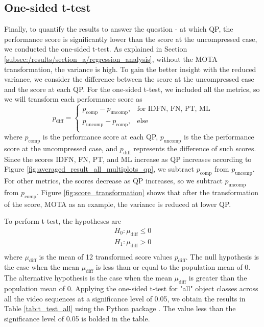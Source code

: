 \subsection{One-sided t-test}
\label{subsec:/results/section_a/t_test}
Finally, to quantify the results to answer the question - at which QP, the performance score is significantly lower than the score at the uncompressed case, we conducted the one-sided t-test. As explained in Section \ref{subsec:/results/section_a/regression_analysis}, without the MOTA transformation, the variance is high. To gain the better insight with the reduced variance, we consider the difference between the score at the uncompressed case and the score at each QP. For the one-sided t-test, we included all the metrics, so we will transform each performance score as
\begin{equation}
  p_{\text{diff}} =
    \begin{cases}
         p_{\text{comp}} - p_{\text{uncomp}} ,& \text{for IDFN, FN, PT, ML} \\        
         p_{\text{uncomp}} - p_{\text{comp}} ,& \text{else} \\
    \end{cases}
\end{equation}
where $p_{\text{comp}}$ is the performance score at each QP, $p_{\text{uncomp}}$ is the the performance score at the uncompressed case, and $p_{\text{diff}}$ represents the difference of such scores. Since the scores IDFN, FN, PT, and ML increase as QP increases according to Figure \ref{fig:averaged_result_all_multiplots_qp}, we subtract $p_{\text{comp}}$ from $p_{\text{uncomp}}$. For other metrics, the scores decrease as QP increases, so we subtract $p_{\text{uncomp}}$ from $p_{\text{comp}}$. Figure \ref{fig:score_transformation} shows that after the transformation of the score, MOTA as an example, the variance is reduced at lower QP.

To perform t-test, the hypotheses are
\begin{equation}
    \begin{aligned}
        H_0 : \mu_{\text{diff}} \leq 0 \\
        H_1 : \mu_{\text{diff}} > 0 \\
    \end{aligned}
\end{equation}
where $\mu_{\text{diff}}$ is the mean of 12 transformed score values $p_{\text{diff}}$. The null hypothesis is the case when the mean $\mu_{\text{diff}}$ is less than or equal to the population mean of 0. The alternative hypothesis is the case when the mean $\mu_{\text{diff}}$ is greater than the population mean of 0. Applying the one-sided t-test for "all" object classes across all the video sequences at a significance level of 0.05, we obtain the results in Table \ref{tab:t_test_all} using the Python package \cite{virtanen_scipy_2020}. The value less than the significance level of 0.05 is bolded in the table.
